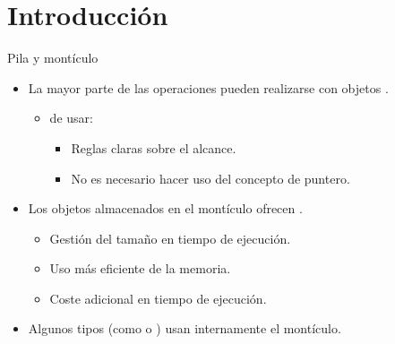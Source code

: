 \section{Introducción}

\begin{frame}[t]{Pila y montículo}
\begin{itemize}
  \item La mayor parte de las operaciones pueden realizarse con objetos 
        .
  \begin{itemize}
    \item {} de usar:
      \begin{itemize}
        \item Reglas claras sobre el alcance.
        \item No es necesario hacer uso del concepto de puntero.
      \end{itemize}
  \end{itemize}

  \item Los objetos almacenados en el montículo ofrecen .
    \begin{itemize}
      \item Gestión del tamaño en tiempo de ejecución.
      \item Uso más eficiente de la memoria.
      \item Coste adicional en tiempo de ejecución.
    \end{itemize}

  \item Algunos tipos (como  o ) usan internamente el montículo.
\end{itemize}
\end{frame}

